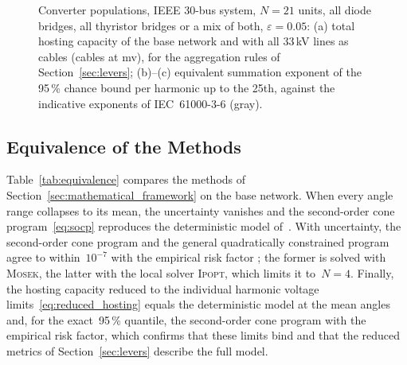 \begin{figure}[!t]
{}%
    \caption{Converter populations, IEEE 30-bus system, $N = 21$ units, all diode bridges, all thyristor bridges or a mix of both, $\varepsilon = 0.05$: (a) total hosting capacity of the base network and with all 33\,kV lines as cables (cables at mv), for the aggregation rules of Section~\ref{sec:levers}; (b)--(c) equivalent summation exponent of the 95\,\% chance bound per harmonic up to the 25th, against the indicative exponents of IEC~61000-3-6 (gray).}
    \label{fig:populations}
\end{figure}

\subsection{Equivalence of the Methods}
\label{sec:equivalence}

Table~\ref{tab:equivalence} compares the methods of Section~\ref{sec:mathematical_framework} on the base network. When every angle range collapses to its mean, the uncertainty vanishes and the second-order cone program~\eqref{eq:socp} reproduces the deterministic model of~\cite{vanacker_hosting_2026}. With uncertainty, the second-order cone program and the general quadratically constrained program agree to within~$10^{-7}$ with the empirical risk factor%
; the former is solved with \textsc{Mosek}, the latter with the local solver \textsc{Ipopt}, which limits it to~$N = 4$. Finally, the hosting capacity reduced to the individual harmonic voltage limits~\eqref{eq:reduced_hosting} equals the deterministic model at the mean angles and, for the exact~95\,\% quantile, the second-order cone program with the empirical risk factor, which confirms that these limits bind and that the reduced metrics of Section~\ref{sec:levers} describe the full model.

